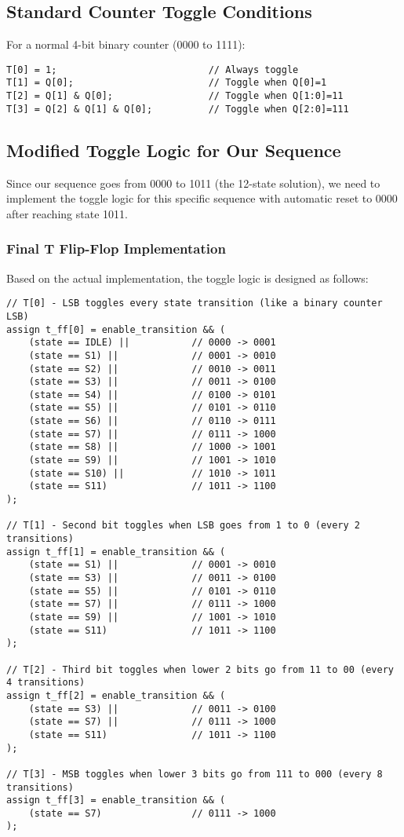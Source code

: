 \documentclass[10pt,a4paper]{article}
\begin{document}
\subsection*{Standard Counter Toggle Conditions}
For a normal 4-bit binary counter (0000 to 1111):

\begin{lstlisting}[style=verilog]
T[0] = 1;                           // Always toggle
T[1] = Q[0];                        // Toggle when Q[0]=1
T[2] = Q[1] & Q[0];                 // Toggle when Q[1:0]=11
T[3] = Q[2] & Q[1] & Q[0];          // Toggle when Q[2:0]=111
\end{lstlisting}

\subsection*{Modified Toggle Logic for Our Sequence}
Since our sequence goes from 0000 to 1011 (the 12-state solution), we need to implement the toggle logic for this specific sequence with automatic reset to 0000 after reaching state 1011.

\subsubsection*{Final T Flip-Flop Implementation}
Based on the actual implementation, the toggle logic is designed as follows:

\begin{lstlisting}[style=verilog]
// T[0] - LSB toggles every state transition (like a binary counter LSB)
assign t_ff[0] = enable_transition && (
    (state == IDLE) ||           // 0000 -> 0001
    (state == S1) ||             // 0001 -> 0010
    (state == S2) ||             // 0010 -> 0011
    (state == S3) ||             // 0011 -> 0100
    (state == S4) ||             // 0100 -> 0101
    (state == S5) ||             // 0101 -> 0110
    (state == S6) ||             // 0110 -> 0111
    (state == S7) ||             // 0111 -> 1000
    (state == S8) ||             // 1000 -> 1001
    (state == S9) ||             // 1001 -> 1010
    (state == S10) ||            // 1010 -> 1011
    (state == S11)               // 1011 -> 1100
);

// T[1] - Second bit toggles when LSB goes from 1 to 0 (every 2 transitions)
assign t_ff[1] = enable_transition && (
    (state == S1) ||             // 0001 -> 0010
    (state == S3) ||             // 0011 -> 0100
    (state == S5) ||             // 0101 -> 0110
    (state == S7) ||             // 0111 -> 1000
    (state == S9) ||             // 1001 -> 1010
    (state == S11)               // 1011 -> 1100
);

// T[2] - Third bit toggles when lower 2 bits go from 11 to 00 (every 4 transitions)
assign t_ff[2] = enable_transition && (
    (state == S3) ||             // 0011 -> 0100
    (state == S7) ||             // 0111 -> 1000
    (state == S11)               // 1011 -> 1100
);

// T[3] - MSB toggles when lower 3 bits go from 111 to 000 (every 8 transitions)
assign t_ff[3] = enable_transition && (
    (state == S7)                // 0111 -> 1000
);
\end{lstlisting}
\end{document}
